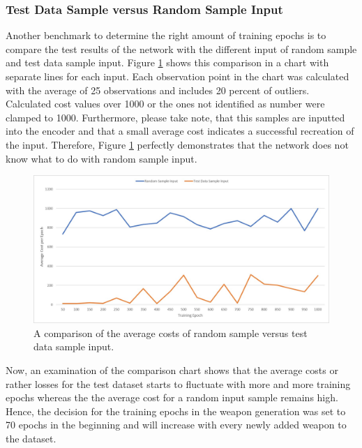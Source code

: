 \documentclass[MGS,Master,english]{twbook}%
\begin{document}
\subsubsection{Test Data Sample versus Random Sample Input}
Another benchmark to determine the right amount of training epochs is to compare the test results of the network with the different input of random sample and test data sample input. Figure \ref{fig::vae::epochsFailureRate} shows this comparison in a chart with separate lines for each input. Each observation point in the chart was calculated with the average of 25 observations and includes 20 percent of outliers. Calculated cost values over 1000 or the ones not identified as number were clamped to 1000. Furthermore, please take note, that this samples are inputted into the encoder and that a small average cost indicates a successful recreation of the input. Therefore, Figure \ref{fig::vae::epochsFailureRate} perfectly demonstrates that the network does not know what to do with random sample input.
\begin{figure}[!ht]
	\centering
	\includegraphics[width=1.0\linewidth]{PICs/trained_vae/epoch_failure_rate}
	\caption{A comparison of the average costs of random sample versus test data sample input.} \label{fig::vae::epochsFailureRate}
\end{figure}

Now, an examination of the comparison chart shows that the average costs or rather losses for the test dataset starts to fluctuate with more and more training epochs whereas the the average cost for a random input sample remains high. Hence, the decision for the training epochs in the weapon generation was set to 70 epochs in the beginning and will increase with every newly added weapon to the dataset. 
\end{document}
